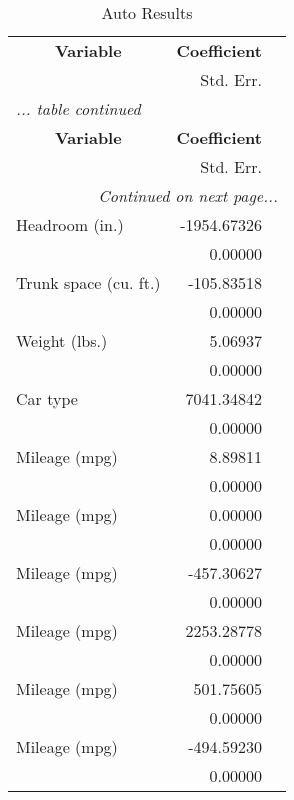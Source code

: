 \documentclass[12pt]{article}
\begin{document}
{
\def\sep{0.5em}
\def\fns{\footnotesize}
\def\onepc{$^{\ast\ast}$} \def\fivepc{$^{\ast}$}
\def\tenpc{$^{\dag}$}
\def\legend{\multicolumn{3}{l}{\footnotesize{Significance levels
:\hspace{1em} $\dag$ : 10\% \hspace{1em}
$\ast$ : 5\% \hspace{1em} $\ast\ast$ : 1\% \normalsize}}}
\begin{center}
\begin{longtable}{l r @{} l }
\caption{Auto Results\label{tabresult regress}}\\
\hline\hline\multicolumn{1}{c}{\textbf{Variable}}
 & \textbf{Coefficient} \\*& \fns{Std. Err.} \\ \hline
\endfirsthead
\multicolumn{3}{l}{\emph{... table \thetable{} continued}}
\\ \hline\hline\multicolumn{1}{c}{\textbf{Variable}}
 & \textbf{Coefficient} \\*& \fns{Std. Err.} \\ \hline
\endhead
\hline
\multicolumn{3}{r}{\emph{Continued on next page...}}\\
\endfoot
\endlastfoot
Headroom (in.) & -1954.67326& \\* & \fns{0.00000} &\\[\sep]
Trunk space (cu. ft.) & -105.83518& \\* & \fns{0.00000} &\\[\sep]
Weight (lbs.) & 5.06937& \\* & \fns{0.00000} &\\[\sep]
Car type & 7041.34842& \\* & \fns{0.00000} &\\[\sep]
Mileage (mpg) & 8.89811& \\* & \fns{0.00000} &\\[\sep]
Mileage (mpg) & 0.00000& \\* & \fns{0.00000} &\\[\sep]
Mileage (mpg) & -457.30627& \\* & \fns{0.00000} &\\[\sep]
Mileage (mpg) & 2253.28778& \\* & \fns{0.00000} &\\[\sep]
Mileage (mpg) & 501.75605& \\* & \fns{0.00000} &\\[\sep]
Mileage (mpg) & -494.59230& \\* & \fns{0.00000} &\\[\sep]

\end{longtable}
\end{center}}
\end{document}
